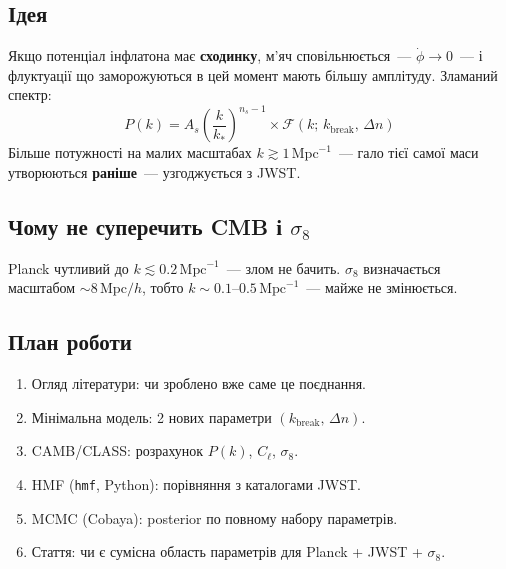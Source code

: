 \documentclass[12pt, a4paper]{article}
\begin{document}
\subsection{Ідея}

Якщо потенціал інфлатона має \textbf{сходинку}, м'яч сповільнюється~---
$\dot{\phi} \to 0$~--- і флуктуації що заморожуються в цей момент мають
більшу амплітуду. Зламаний спектр:
\begin{equation*}
  P(k) = A_s \left(\frac{k}{k_*}\right)^{n_s-1}
  \times \mathcal{F}(k;\, k_\mathrm{break},\, \Delta n)
\end{equation*}
Більше потужності на малих масштабах $k \gtrsim 1\,\mathrm{Mpc}^{-1}$~---
гало тієї самої маси утворюються \textbf{раніше}~--- узгоджується з JWST.

\subsection{Чому не суперечить CMB і $\sigma_8$}

Planck чутливий до $k \lesssim 0.2\,\mathrm{Mpc}^{-1}$~--- злом не бачить.
$\sigma_8$ визначається масштабом $\sim 8\,\mathrm{Mpc}/h$, тобто
$k \sim 0.1$--$0.5\,\mathrm{Mpc}^{-1}$~--- майже не змінюється.

\subsection{План роботи}

\begin{enumerate}
  \item Огляд літератури: чи зроблено вже саме це поєднання.
  \item Мінімальна модель: 2 нових параметри $(k_\mathrm{break},\, \Delta n)$.
  \item CAMB/CLASS: розрахунок $P(k)$, $C_\ell$, $\sigma_8$.
  \item HMF (\texttt{hmf}, Python): порівняння з каталогами JWST.
  \item MCMC (Cobaya): posterior по повному набору параметрів.
  \item Стаття: чи є сумісна область параметрів для Planck + JWST + $\sigma_8$.
\end{enumerate}


\printbibliography
\end{document}
